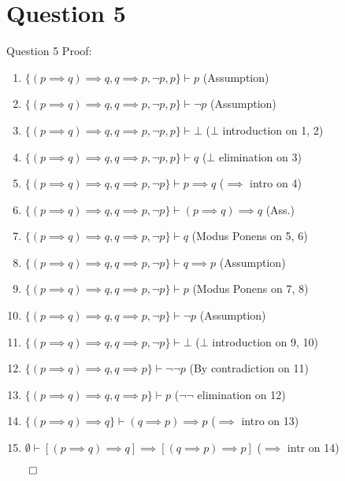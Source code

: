 \documentclass{beamer}
\begin{document}
    \section{Question 5}
    {
        \begin{frame}{Question 5}
            Proof:         
            \begin{enumerate}
                \item $\{(p \implies q) \implies q, q \implies p, \neg p, p\} \vdash p$ (Assumption)
                \item $\{(p \implies q) \implies q, q \implies p, \neg p, p\} \vdash \neg p$ (Assumption)
                \item $\{(p \implies q) \implies q, q \implies p, \neg p, p\} \vdash \bot$ ($\bot$ introduction on 1, 2)
                \item $\{(p \implies q) \implies q, q \implies p, \neg p, p\} \vdash q$ ($\bot$ elimination on 3)
                \item $\{(p \implies q) \implies q, q \implies p, \neg p\} \vdash p \implies q$ ($\implies$ intro on 4)
                \item $\{(p \implies q) \implies q, q \implies p, \neg p\} \vdash (p \implies q) \implies q$ (Ass.)
                \item $\{(p \implies q) \implies q, q \implies p, \neg p\} \vdash q$ (Modus Ponens on 5, 6)
                \item $\{(p \implies q) \implies q, q \implies p, \neg p\} \vdash q \implies p$ (Assumption)
                \item $\{(p \implies q) \implies q, q \implies p, \neg p\} \vdash p$ (Modus Ponens on 7, 8)
                \item $\{(p \implies q) \implies q, q \implies p, \neg p\} \vdash \neg p$ (Assumption)
                \item $\{(p \implies q) \implies q, q \implies p, \neg p\} \vdash \bot$ ($\bot$ introduction on 9, 10)
                \item $\{(p \implies q) \implies q, q \implies p\} \vdash \neg \neg p$ (By contradiction on 11)
                \item $\{(p \implies q) \implies q, q \implies p\} \vdash p$ ($\neg \neg$ elimination on 12)
                \item $\{(p \implies q) \implies q\} \vdash (q \implies p) \implies p$ ($\implies$ intro on 13)
                \item $\emptyset \vdash \left[(p \implies q) \implies q\right] \implies \left[(q \implies p) \implies p\right]$ ($\implies$ intr on 14)
            \end{enumerate}
            $\qed$
        \end{frame}
    }
\end{document}
